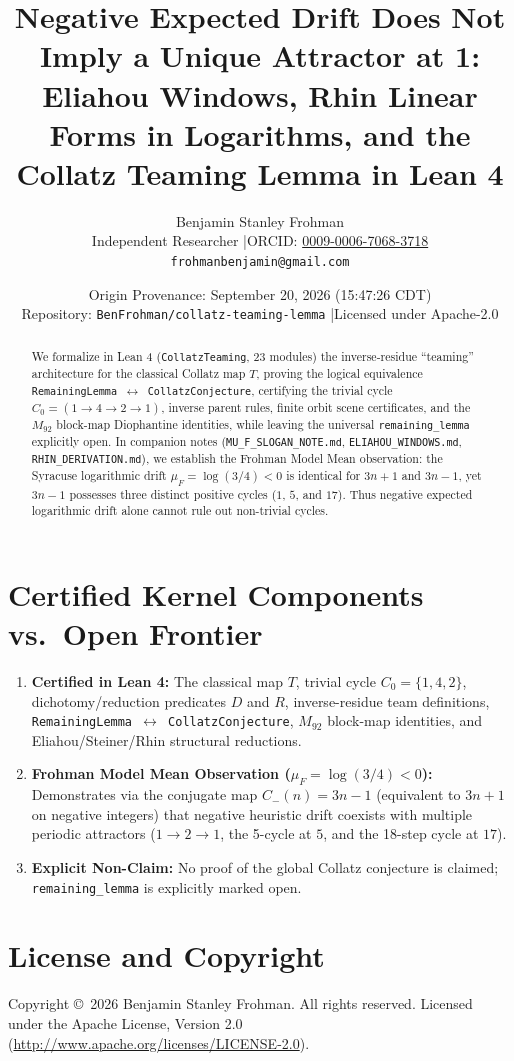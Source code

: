 \documentclass[11pt]{article}
\title{\textbf{Negative Expected Drift Does Not Imply a Unique Attractor at 1: Eliahou Windows, Rhin Linear Forms in Logarithms, and the Collatz Teaming Lemma in Lean 4}}
\author{Benjamin Stanley Frohman\\
\small Independent Researcher \quad|\quad ORCID: \href{https://orcid.org/0009-0006-7068-3718}{0009-0006-7068-3718}\\
\small \texttt{frohmanbenjamin@gmail.com}}
\date{Origin Provenance: September 20, 2026 (15:47:26 CDT) \\ \small Repository: \texttt{BenFrohman/collatz-teaming-lemma} \quad|\quad Licensed under Apache-2.0}
\begin{document}
\maketitle

\begin{abstract}
We formalize in Lean 4 (\texttt{CollatzTeaming}, 23 modules) the inverse-residue ``teaming'' architecture for the classical Collatz map $T$, proving the logical equivalence \texttt{RemainingLemma $\leftrightarrow$ CollatzConjecture}, certifying the trivial cycle $C_0 = (1 \to 4 \to 2 \to 1)$, inverse parent rules, finite orbit scene certificates, and the $M_{92}$ block-map Diophantine identities, while leaving the universal \texttt{remaining\_lemma} explicitly open. In companion notes (\texttt{MU\_F\_SLOGAN\_NOTE.md}, \texttt{ELIAHOU\_WINDOWS.md}, \texttt{RHIN\_DERIVATION.md}), we establish the Frohman Model Mean observation: the Syracuse logarithmic drift $\mu_F = \log(3/4) < 0$ is identical for $3n+1$ and $3n-1$, yet $3n-1$ possesses three distinct positive cycles ($1$, $5$, and $17$). Thus negative expected logarithmic drift alone cannot rule out non-trivial cycles.
\end{abstract}

\section{Certified Kernel Components vs.\ Open Frontier}
\begin{enumerate}
  \item \textbf{Certified in Lean 4:} The classical map $T$, trivial cycle $C_0 = \{1,4,2\}$, dichotomy/reduction predicates $D$ and $R$, inverse-residue team definitions, \texttt{RemainingLemma $\leftrightarrow$ CollatzConjecture}, $M_{92}$ block-map identities, and Eliahou/Steiner/Rhin structural reductions.
  \item \textbf{Frohman Model Mean Observation ($\mu_F = \log(3/4) < 0$):} Demonstrates via the conjugate map $C_-(n) = 3n-1$ (equivalent to $3n+1$ on negative integers) that negative heuristic drift coexists with multiple periodic attractors ($1 \to 2 \to 1$, the 5-cycle at $5$, and the 18-step cycle at $17$).
  \item \textbf{Explicit Non-Claim:} No proof of the global Collatz conjecture is claimed; \texttt{remaining\_lemma} is explicitly marked open.
\end{enumerate}

\section*{License and Copyright}
Copyright \copyright\ 2026 Benjamin Stanley Frohman. All rights reserved. Licensed under the Apache License, Version 2.0 (\url{http://www.apache.org/licenses/LICENSE-2.0}).
\end{document}
